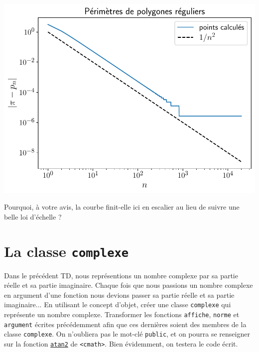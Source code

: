 \documentclass{book}
\newcommand{\inline}[1]{\texttt{#1}}
\begin{document}
\begin{correction}
\begin{center}
\includegraphics[width=0.45\paperwidth]{TD2/perimetres-polygones-reguliers.pdf}
\end{center}

Pourquoi, à votre avis, la courbe finit-elle ici en escalier au lieu de suivre une belle loi d'échelle ?

\end{correction}

\renewenvironment{correction}{}{}

\section{La classe \texttt{complexe}}
 
Dans le précédent TD, nous représentions un nombre complexe par sa partie réelle et sa partie imaginaire. Chaque fois que nous passions un nombre complexe en argument d'une fonction nous devions passer sa partie réelle et sa partie imaginaire... En utilisant le concept d'objet, créer une classe \inline{complexe} qui représente un nombre complexe. Transformer les fonctions \inline{affiche}, \inline{norme} et \inline{argument} écrites précédemment afin que ces dernières soient des membres de la classe \inline{complexe}. On n'oubliera pas le mot-clé \inline{public}, et on pourra se renseigner sur la fonction \href{http://en.cppreference.com/w/cpp/numeric/math/atan2}{\inline{atan2}} de \inline{<cmath>}. Bien évidemment, on testera le code écrit.
\end{document}
